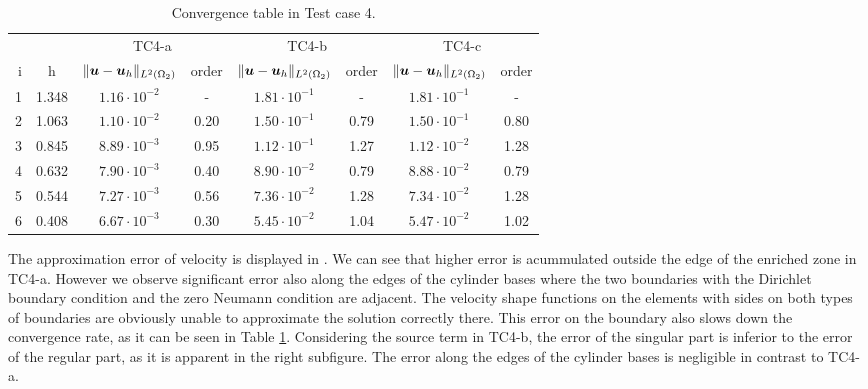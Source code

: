 \begin{table}[!htb]
\begin{center}
\bgroup
\def\arraystretch{1.2}
\setlength\tabcolsep{5pt}
\begin{tabular}{rc|cc|cc|cc}
\toprule
\multicolumn{2}{c|}{} & \multicolumn{2}{c|}{ TC4-a } & \multicolumn{2}{c|}{ TC4-b } & \multicolumn{2}{c}{TC4-c}\\ [3pt] %
i & h & $\|\mathbf{\boldsymbol{u}}-\mathbf{\boldsymbol{u}}_h\|_{L^2(\Omega_2)}$ & order & $\|\mathbf{\boldsymbol{u}}-\mathbf{\boldsymbol{u}}_h\|_{L^2(\Omega_2)}$
    & order & $\|\mathbf{\boldsymbol{u}}-\mathbf{\boldsymbol{u}}_h\|_{L^2(\Omega_2)}$ & order \\ [3pt] \midrule
1 & 1.348 &  $1.16\cdot10^{-2}$  &  -   &  $1.81\cdot10^{-1}$  &  -   &  $1.81\cdot10^{-1}$ &   -   \\
2 & 1.063 &  $1.10\cdot10^{-2}$  & 0.20 &  $1.50\cdot10^{-1}$  & 0.79 &  $1.50\cdot10^{-1}$ &  0.80 \\
3 & 0.845 &  $8.89\cdot10^{-3}$  & 0.95 &  $1.12\cdot10^{-1}$  & 1.27 &  $1.12\cdot10^{-2}$ &  1.28 \\
4 & 0.632 &  $7.90\cdot10^{-3}$  & 0.40 &  $8.90\cdot10^{-2}$  & 0.79 &  $8.88\cdot10^{-2}$ &  0.79 \\
5 & 0.544 &  $7.27\cdot10^{-3}$  & 0.56 &  $7.36\cdot10^{-2}$  & 1.28 &  $7.34\cdot10^{-2}$ &  1.28 \\
6 & 0.408 &  $6.67\cdot10^{-3}$  & 0.30 &  $5.45\cdot10^{-2}$  & 1.04 &  $5.47\cdot10^{-2}$ &  1.02 \\
\bottomrule
\end{tabular}
\caption{Convergence table in Test case 4.}
\label{tab:mh_tc4_convergence}
\egroup
\end{center}
\end{table}

The approximation error of velocity is displayed in . We can see that higher
error is acummulated outside the edge of the enriched zone in TC4-a. However we observe significant error also
along the edges of the cylinder bases where the two boundaries with the Dirichlet boundary condition and the zero Neumann condition
are adjacent. The velocity shape functions on the elements with sides on both types of boundaries are obviously unable to approximate
the solution correctly there. This error on the boundary also slows down the convergence rate, as it can be seen in Table \ref{tab:mh_tc4_convergence}.
Considering the source term in TC4-b, the error of the singular part is inferior to the error of the regular part, as it is apparent
in the right subfigure. The error along the edges of the cylinder bases is negligible in contrast to TC4-a.



